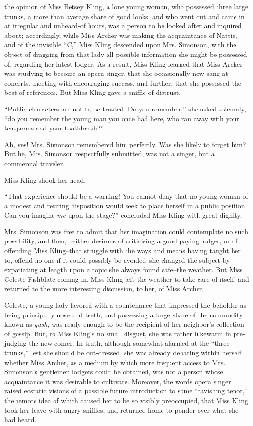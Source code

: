  the opinion of Miss Betsey Kling, a lone young woman, who possessed
three large trunks, a more than average share of good looks, and who
went out and came in at irregular and unheard-of hours, was a person to
be looked after and inquired about; accordingly, while Miss Archer was
making the acquaintance of Nattie, and of the invisible ``C,'' Miss Kling
descended upon Mrs. Simonson, with the object of dragging from that lady
all possible information she might be possessed of, regarding her latest
lodger. As a result, Miss Kling learned that Miss Archer was studying to
become an opera singer, that she occasionally now sang at concerts,
meeting with encouraging success, and further, that she possessed the
best of references. But Miss Kling gave a sniffle of distrust.

``Public characters are not to be trusted. Do you remember,'' she asked
solemnly, ``do you remember the young man you once had here, who ran away
with your teaspoons and your toothbrush?''

Ah, yes! Mrs. Simonson remembered him perfectly. Was she likely to
forget him? But he, Mrs. Simonson respectfully submitted, was not a
singer, but a commercial traveler.

Miss Kling shook her head.

``That experience should be a warning! You cannot deny that no young
woman of a modest and retiring disposition would seek to place herself
in a public position. Can you imagine \emph{me} upon the stage?'' concluded Miss
Kling with great dignity.

Mrs. Simonson was free to admit that her imagination could contemplate
no such possibility, and then, neither desirous of criticising a good
paying lodger, or of offending Miss Kling--that struggle with the ways
and means having taught her to, offend no one if it could possibly be
avoided--she changed the subject by expatiating at length upon a topic
she always found safe--the weather. But Miss Celeste Fishblate coming
in, Miss Kling left the weather to take care of itself, and returned to
the more interesting discussion, to her, of Miss Archer.

Celeste, a young lady favored with a countenance that impressed the
beholder as being principally nose and teeth, and possessing a large
share of the commodity known as \emph{gush}, was ready enough to be the
recipient of her neighbor's collection of gossip. But, to Miss Kling's
no small disgust, she was rather lukewarm in pre-judging the new-comer.
In truth, although somewhat alarmed at the ``three trunks,'' lest she
should be out-dressed, she was already debating within herself whether
Miss Archer, as a medium by which more frequent access to Mrs.
Simonson's gentlemen lodgers could be obtained, was not a person whose
acquaintance it was desirable to cultivate. Moreover, the words opera
singer raised ecstatic visions of a possible future introduction to some
``ravishing tenor,'' the remote idea of which caused her to be so visibly
preoccupied, that Miss Kling took her leave with angry sniffles, and
returned home to ponder over what she had heard.

